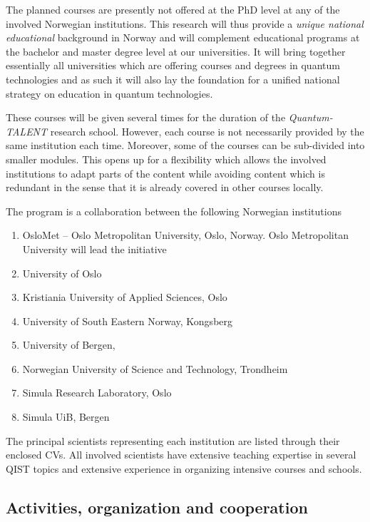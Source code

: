 \documentclass{scrreprt}
\begin{document}
The planned  courses are presently not offered at the PhD level at any
of the involved Norwegian institutions.  This research will thus provide
a \textit{unique national educational} background in
Norway and will complement educational programs at the bachelor and
master degree level at our universities. It will bring together
essentially all universities which are offering courses and degrees in
quantum technologies and as such it will also lay the foundation for a
unified national strategy on education in quantum technologies.

These courses will be given several times for the duration of the \textit{Quantum-TALENT} research school. However, each course is not necessarily provided by the same institution each time. Moreover, some of the courses can be sub-divided into smaller modules. This opens up for a flexibility which allows the involved institutions to adapt parts of the content while avoiding content which is redundant in the sense that it is already covered in other courses locally.

The program is a collaboration between the following Norwegian institutions

\begin{enumerate}
\item OsloMet -- Oslo Metropolitan University, Oslo, Norway. Oslo Metropolitan University will lead the initiative
\item  University of Oslo
\item Kristiania University of Applied Sciences, Oslo
\item University of South Eastern Norway, Kongsberg
\item  University of Bergen, 
\item Norwegian University of Science and Technology, Trondheim
\item Simula Research Laboratory, Oslo
\item Simula UiB, Bergen
\end{enumerate}
The principal scientists representing each institution are listed through their enclosed CVs. All involved scientists have extensive teaching expertise in several QIST topics and extensive experience in organizing intensive courses and schools. 

\subsection{Activities, organization and cooperation}
\end{document}
